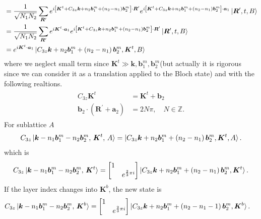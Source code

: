 \documentclass[10pt, oneside]{article}
\newcommand{\p}[1]{\left(#1\right)}
\newcommand{\bb}[1]{\left[#1\right]}
\begin{document}
\begin{align}
\begin{split}
		& = \frac{1}{\sqrt{N_{1} N_{2}}} \sum_{\bm{R}^\prime} e^{i \bb{\bm{K}^{t} + C_{3z} \bm{k} + n_{2} \bm{b}^{m}_{1} + \p{n_{2} - n_{1}} \bm{b}^{m}_{2}} \cdot \bm{R}^{\prime} }  e^{i \bb{\bm{K}^{t} + C_{3z} \bm{k} + n_{2} \bm{b}^{m}_{1} + \p{n_{2} - n_{1}} \bm{b}^{m}_{2}} \cdot \bm{a}_{1}} \ket{ \bm{R}^{\prime}, t, B} \\
		& = \frac{1}{\sqrt{N_{1} N_{2}}} \sum_{\bm{R}^\prime} e^{i \bm{K}^{t} \cdot \bm{a}_{1}} e^{i \bb{\bm{K}^{t} + C_{3z} \bm{k} + n_{2} \bm{b}^{m}_{1} + \p{n_{2} - n_{1}} \bm{b}^{m}_{2}} \cdot \bm{R}^{\prime} } \ket{ \bm{R}^{\prime}, t, B} \\
		& = e^{i \bm{K}^{t} \cdot \bm{a}_{1}} \ket{C_{3z} \bm{k} +n_{2} \bm{b}^{m}_{1} + \p{n_{2} - n_{1}} \bm{b}^{m}_{2}, \bm{K}^{t}, B} 
	\end{split}
\end{align}
where we neglect small term since \(\bm{K}^{t} \gg \bm{k}, \bm{b}^{m}_{1},  \bm{b}^{m}_{2}\)(but actually it is rigorous since we can consider it as a translation applied to the Bloch state) and with the following realtions.
\begin{align}
	\begin{split}
		C_{3z}  \bm{K}^{t}  & =  \bm{K}^{t} + \bm{b}_{2} \\
		\bm{b}_{2} \cdot \p{\bm{R}^{\prime} + \bm{a}_{2}} &= 2N \pi, \quad N \in \mathbb{Z}.
	\end{split}
\end{align}
For sublattice \(A\)
\begin{align}
	C_{3z} \ket{\bm{k} - n_{1} \bm{b}^{m}_{1} - n_{2} \bm{b}^{m}_{2}, \, \bm{K}^{t},\, A}  = \ket{C_{3z} \bm{k} +n_{2} \bm{b}^{m}_{1} + \p{n_{2} - n_{1}} \bm{b}^{m}_{2}, \bm{K}^{t}, A}.
\end{align}
which is 
\begin{align}
	C_{3z} \ket{\bm{k} - n_{1} \bm{b}^{m}_{1} - n_{2} \bm{b}^{m}_{2}, \, \bm{K}^{t}} = \begin{bmatrix}
		1 & \\ 
		 & e^{\frac{2}{3} \pi i}
	\end{bmatrix} \ket{C_{3z} \bm{k} +n_{2} \bm{b}^{m}_{1} + \p{n_{2} - n_{1}} \bm{b}^{m}_{2}, \bm{K}^{t}}.
\end{align}
If the layer index changes into \(\bm{K}^{b}\), the new state is 
\begin{align}
		C_{3z} \ket{\bm{k} - n_{1} \bm{b}^{m}_{1} - n_{2} \bm{b}^{m}_{2}, \, \bm{K}^{b}}  & = \begin{bmatrix}
			1 & \\ 
			 & e^{\frac{2}{3} \pi i}
		\end{bmatrix} \ket{C_{3z} \bm{k} +n_{2} \bm{b}^{m}_{1} + \p{n_{2} - n_{1} -1} \bm{b}^{m}_{2}, \bm{K}^{b}}.
\end{align}
\end{document}
